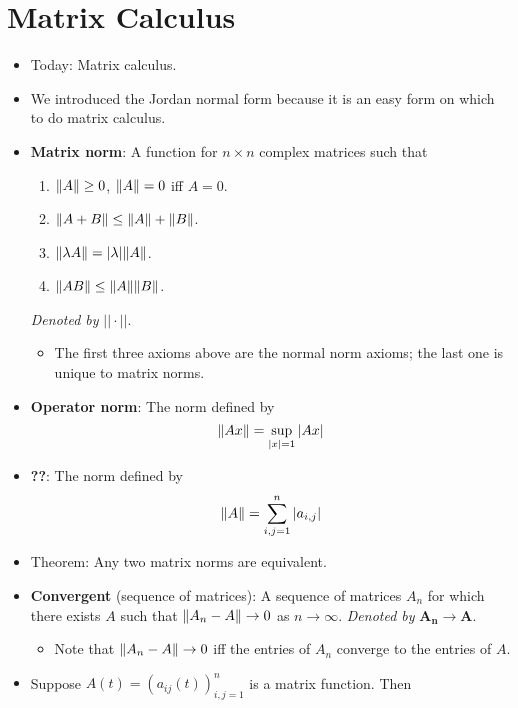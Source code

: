 \documentclass[../notes.tex]{subfiles}
\begin{document}
\section{Matrix Calculus}
\begin{itemize}
    \item {}Today: Matrix calculus.
    \item We introduced the Jordan normal form because it is an easy form on which to do matrix calculus.
    \item \textbf{Matrix norm}: A function for $n\times n$ complex matrices such that
    \begin{enumerate}
        \item $\norm{A}\geq 0$, $\norm{A}=0$ iff $A=0$.
        \item $\norm{A+B}\leq\norm{A}+\norm{B}$.
        \item $\norm{\lambda A}=|\lambda|\norm{A}$.
        \item $\norm{AB}\leq\norm{A}\norm{B}$.
    \end{enumerate}
    \emph{Denoted by} $\bm{||\cdot||}$.
    \begin{itemize}
        \item The first three axioms above are the normal norm axioms; the last one is unique to matrix norms.
    \end{itemize}
    \item \textbf{Operator norm}: The norm defined by
    \begin{equation*}
        \norm{Ax} = \sup_{|x|=1}|Ax|
    \end{equation*}
    \item \textbf{??}: The norm defined by
    \begin{equation*}
        \norm{A} = \sum_{i,j=1}^n|a_{i,j}|
    \end{equation*}
    \item Theorem: Any two matrix norms are equivalent.
    \item \textbf{Convergent} (sequence of matrices): A sequence of matrices $A_n$ for which there exists $A$ such that $\norm{A_n-A}\to 0$ as $n\to\infty$. \emph{Denoted by} $\bm{A_n\to A}$.
    \begin{itemize}
        \item Note that $\norm{A_n-A}\to 0$ iff the entries of $A_n$ converge to the entries of $A$.
    \end{itemize}
    \item Suppose $A(t)=(a_{ij}(t))_{i,j=1}^n$ is a matrix function. Then

\end{itemize}
\end{document}
